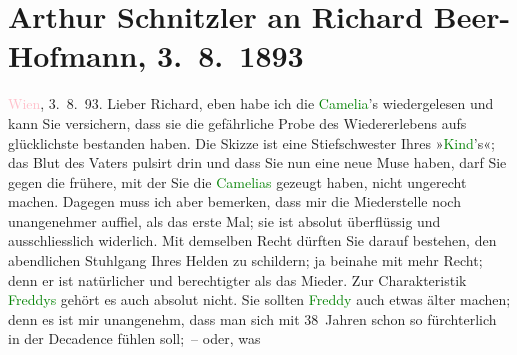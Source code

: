 

               \section[Arthur Schnitzler an Richard Beer-Hofmann, 3. 8. 1893]{ Arthur Schnitzler an Richard Beer-Hofmann, 3. 8. 1893}\nopagebreak{}\rehead{ }\normalsize\beginnumbering{} \toendnotes[C]{\smallbreak\pagebreak[2]} 
\toendnotes[C]{\smallbreak}\pstart
           \raggedleft{}{\pb}\textcolor{pink}{Wien}{}\ledrightnote{\textcolor{pink}{Wien}}, 3. 8. 93.\pend
           \pstart
           Lieber Richard, eben habe ich die \textcolor{green}{Camelia}{}\ledrightnote{\textcolor{green}{Camelias}}’s wiedergelesen und kann Sie versichern, dass sie die gefährliche
               Probe des Wiedererlebens aufs glücklichste bestanden haben. Die Skizze ist eine
               Stiefschwester Ihres »\textcolor{green}{Kind}{}\ledrightnote{\textcolor{green}{Das Kind}}’s«; das Blut des Vaters
               pulsirt drin und dass Sie nun eine neue Muse haben, darf Sie gegen die frühere, mit
               der Sie die \textcolor{green}{Camelias}{}\ledrightnote{\textcolor{green}{Camelias}} gezeugt haben, nicht ungerecht
               machen. Dagegen muss ich aber bemerken, dass mir die Miederstelle noch unangenehmer
               auffiel, als das erste Mal; sie ist absolut überflüssig und ausschliesslich
               widerlich. Mit demselben Recht dürften Sie darauf bestehen, den abendlichen Stuhlgang
               Ihres Helden zu schildern; ja beinahe mit mehr Recht; denn er ist natürlicher und
               berechtigter als das Mieder. Zur Charakteristik \textcolor{green}{Freddys}{} gehört es auch absolut nicht. Sie sollten \textcolor{green}{Freddy}{} auch etwas älter machen;
               denn es ist mir unangenehm, dass man sich mit 38 Jahren schon so fürchterlich {\pb}in der Decadence fühlen soll; – oder, was
